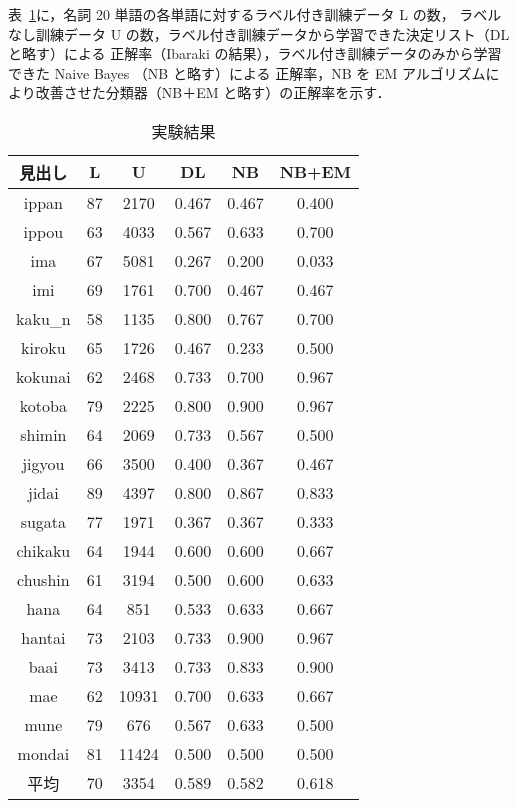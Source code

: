 \mbox{表 \ref{result2}}に，名詞 20 単語の各単語に対するラベル付き訓練データ L の数，
ラベルなし訓練データ U の数，ラベル付き訓練データから学習できた決定リスト（DL と略す）による
正解率（Ibaraki の結果），ラベル付き訓練データのみから学習できた Naive Bayes （NB と略す）による
正解率，NB を EM アルゴリズムにより改善させた分類器（NB＋EM と略す）の正解率を示す．

\begin{table}[htbp]
  \begin{center}
    \leavevmode
    \caption{実験結果}\label{result2}
    \begin{tabular}{|c|c|c|c|c|c|} \hline
見出し    &  L    &  U  &  DL      & NB  & NB+EM \\ \hline
ippan     &   87  & 2170  &   0.467  & 0.467    &  0.400      \\ 
ippou     &   63  & 4033  &   0.567  & 0.633    &  0.700     \\ 
ima       &   67  & 5081  &   0.267  & 0.200    &  0.033     \\ 
imi       &   69  & 1761  &   0.700  & 0.467    &  0.467     \\ 
kaku\_n   &   58  & 1135  &   0.800  & 0.767    &  0.700     \\ 
kiroku    &   65  & 1726  &   0.467  & 0.233    &  0.500     \\ 
kokunai   &   62  & 2468  &   0.733  & 0.700    &  0.967     \\ 
kotoba    &   79  & 2225  &   0.800  & 0.900    &  0.967     \\ 
shimin    &   64  & 2069  &   0.733  & 0.567    &  0.500     \\ 
jigyou    &   66  & 3500  &   0.400  & 0.367    &  0.467     \\ 
jidai     &   89  & 4397  &   0.800  & 0.867    &  0.833     \\ 
sugata    &   77  & 1971  &   0.367  & 0.367    &  0.333     \\ 
chikaku   &   64  & 1944  &   0.600  & 0.600    &  0.667     \\ 
chushin   &   61  & 3194  &   0.500  & 0.600    &  0.633     \\ 
hana      &   64  &  851  &   0.533  & 0.633    &  0.667     \\ 
hantai    &   73  & 2103  &   0.733  & 0.900    &  0.967     \\ 
baai      &   73  & 3413  &   0.733  & 0.833    &  0.900     \\ 
mae       &   62  & 10931 &   0.700  & 0.633    &  0.667     \\ 
mune      &   79  &   676 &   0.567  & 0.633    &  0.500     \\ 
mondai    &   81  & 11424 &   0.500  & 0.500    &  0.500     \\  \hline
平均      &   70  &  3354    &   0.589  & 0.582    &  0.618     \\ \hline
    \end{tabular}
  \end{center}
\end{table}

